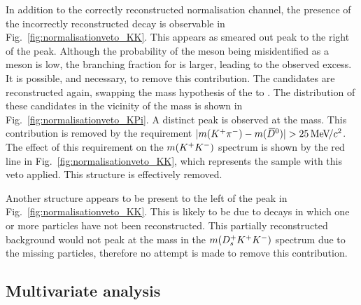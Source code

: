 In addition to the correctly reconstructed normalisation channel, the presence of the incorrectly reconstructed \decay{\Bp}{\Dsp(\decay{\Dzb}{\Kp\pim})} decay is observable in Fig.~\ref{fig:normalisationveto_KK}. This appears as smeared out peak to the right of the \Dzb peak. Although the probability of the \pim meson being misidentified as a \Km meson is low, the branching fraction for \decay{\Dzb}{\Kp\pim} is larger, leading to the observed excess. It is possible, and necessary, to remove this contribution. The \Kp\Km candidates are reconstructed again, swapping the mass hypothesis of the \Km to \pim. The distribution of these candidates in the vicinity of the \Dzb mass is shown in Fig.~\ref{fig:normalisationveto_KPi}. A distinct peak is observed at the \Dzb mass. This contribution is removed by the requirement $|m({{K}^+}{{\pi}^-}) - m({{\kern 0.2em\overline{\kern -0.2em D}{}}{}^0})| > 25 {\mathrm{\,Me\kern -0.1em V\!/}c^2}$. The effect of this requirement on the $m({{K}^+}{{K}^-})$ spectrum is shown by the red line in Fig.~\ref{fig:normalisationveto_KK}, which represents the sample with this veto applied. This structure is effectively removed. 

Another structure appears to be present to the left of the \Dzb peak in Fig.~\ref{fig:normalisationveto_KK}. This is likely to be due to  decays in which one or more particles have not been reconstructed. This partially reconstructed background would not peak at the \Bp mass in the $m({{D}^+_{s}}{{K}^+}{{K}^-})$ spectrum due to the missing particles, therefore no attempt is made to remove this contribution.


\subsection{Multivariate analysis}

